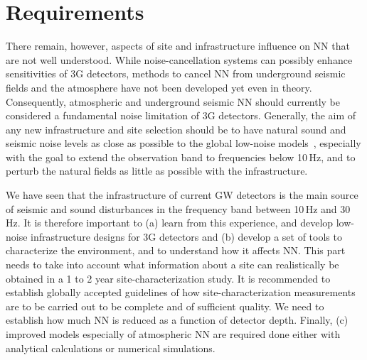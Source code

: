\section{Requirements}
There remain, however, aspects of site and infrastructure influence on NN that are not well understood. 
While noise-cancellation systems can possibly enhance sensitivities of 3G detectors, methods to cancel NN from underground seismic fields and the atmosphere have not been developed yet even in theory. Consequently, atmospheric and underground seismic NN should currently be considered a fundamental noise limitation of 3G detectors. Generally, the aim of any new infrastructure and site selection should be to have natural sound and seismic noise levels as close as possible to the global low-noise models~\cite{Pet1993}, especially with the goal to extend the observation band to frequencies below 10\,Hz, and to perturb the natural fields as little as possible with the infrastructure. 

We have seen that the infrastructure of current GW detectors is the main source of seismic and sound disturbances in the frequency band between 10\,Hz and 30\,Hz. It is therefore important to (a) learn from this experience, and develop low-noise infrastructure designs for 3G detectors %
and (b) 
develop a set of tools to characterize the environment, and to understand how it affects NN. This part needs to take into account what information about a site can realistically be obtained in a 1 to 2 year site-characterization study. It is recommended to establish globally accepted guidelines of how site-characterization measurements are to be carried out to be complete and of sufficient quality. We need to establish how much NN is reduced as a function of detector depth. Finally, (c) improved models especially of atmospheric NN are required done either with analytical calculations or numerical simulations.

